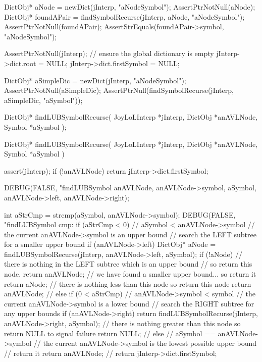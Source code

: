   DictObj* aNode = newDict(jInterp, "aNodeSymbol");
  AssertPtrNotNull(aNode);
  DictObj* foundAPair = findSymbolRecurse(jInterp, aNode, "aNodeSymbol");
  AssertPtrNotNull(foundAPair);
  AssertStrEquals(foundAPair->symbol, "aNodeSymbol");
\stopCTest
\stopTestCase

\startCTest
  AssertPtrNotNull(jInterp);
  // ensure the global dictionary is empty
  jInterp->dict.root        = NULL;
  jInterp->dict.firstSymbol = NULL;

  DictObj* aSimpleDic = newDict(jInterp, "aNodeSymbol");
  AssertPtrNotNull(aSimpleDic);
  AssertPtrNull(findSymbolRecurse(jInterp, aSimpleDic, "aSymbol"));
\stopCTest
\stopTestCase
\stopTestSuite

\startCHeader
DictObj* findLUBSymbolRecurse(
  JoyLoLInterp *jInterp,
  DictObj      *anAVLNode,
  Symbol       *aSymbol
);
\stopCHeader
{}

\startCCode
DictObj* findLUBSymbolRecurse(
  JoyLoLInterp *jInterp,
  DictObj      *anAVLNode,
  Symbol       *aSymbol
) {
  assert(jInterp);
  if (!anAVLNode) return jInterp->dict.firstSymbol;

  DEBUG(FALSE, "findLUBSymbol %
        anAVLNode, anAVLNode->symbol, aSymbol,
        anAVLNode->left, anAVLNode->right);

  int aStrCmp = strcmp(aSymbol, anAVLNode->symbol);
  DEBUG(FALSE, "findLUBSymbol cmp: %
  if (aStrCmp < 0) {
    // aSymbol < anAVLNode->symbol
    // the current anAVLNode->symbol is an upper bound
    // search the LEFT subtree for a smaller upper bound
    if (anAVLNode->left) {
      DictObj* aNode = findLUBSymbolRecurse(jInterp, anAVLNode->left, aSymbol);
      if (!aNode) {
        // there is nothing in the LEFT subtree which is an upper bound
        // so return this node.
        return anAVLNode;
      }
      // we have found a smaller upper bound... so return it
      return aNode;
    }
    // there is nothing less than this node so return this node
    return anAVLNode;
    //
  } else if (0 < aStrCmp) {
    // anAVLNode->symbol < symbol
    // the current anAVLNode->symbol is a lower bound
    // search the RIGHT subtree for any upper bounds
    if (anAVLNode->right) {
      return findLUBSymbolRecurse(jInterp, anAVLNode->right, aSymbol);
    }
    // there is nothing greater than this node so return NULL to signal failure
    return NULL;
    //
  } else {
    // aSymbol == anAVLNode->symbol
    // the current anAVLNode->symbol is the lowest possible upper bound
    // return it
    return anAVLNode;
    //
  }
  return jInterp->dict.firstSymbol;
}
\stopCCode

